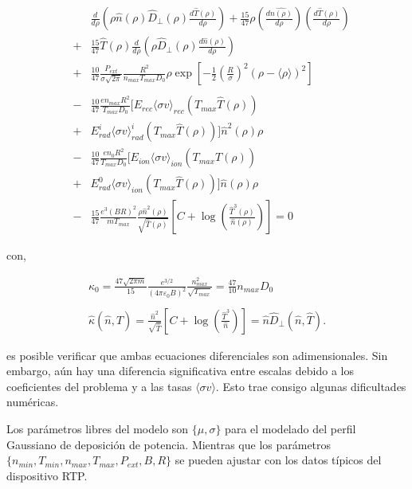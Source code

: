 \begin{eqnarray}
	&& \frac{d}{d\rho}\left(\rho \hat{n}(\rho) \hat{D}_\perp(\rho)\frac{d\hat{T}(\rho)}{d\rho} \right) + \frac{15}{47}\rho\left(\frac{d\hat{n(\rho)}}{d\rho}\right)\left(\frac{d\hat{T}(\rho)}{d\rho}\right) \nonumber \\
	&+& \frac{15}{47}\hat{T}(\rho)\frac{d}{d\rho}\left(\rho \hat{D}_\perp(\rho) \frac{d\hat{n}(\rho)}{d\rho}\right) \nonumber \\ 
	&+& \frac{10}{47}\frac{P_{ext}}{\sigma\sqrt{2\pi}}\frac{R^2}{n_{max}T_{max}D_0}\rho\exp{\left[-\frac{1}{2}\left(\frac{R}{\sigma}\right)^2(\rho - \langle \rho \rangle)^2\right]}\nonumber \\ \nonumber\\
	&-& \frac{10}{47}\frac{ e n_{max}R^2}{T_{max} D_0}\biggl[E_{rec}\langle \sigma v \rangle_{rec}(T_{max}\hat{T}(\rho))\nonumber \\   
	&+& E_{rad}^i\langle \sigma v \rangle_{rad}^i(T_{max}\hat{T}(\rho))\biggr]\hat{n}^2(\rho)\rho \nonumber \\ 
	&-& \frac{10}{47}\frac{e n_0R^2}{T_{max}D_0}\biggl[ E_{ion}\langle \sigma v \rangle_{ion}(T_{max}\hat{T}(\rho)) \nonumber\\ 
	&+& E_{rad}^0\langle \sigma v \rangle_{ion}(T_{max}\hat{T}(\rho)) \biggr]\hat{n}(\rho)\rho \nonumber \\ 
	&-&\frac{15}{47}\frac{e^3(BR)^2}{mT_{max}}\frac{\rho \hat{n}^2(\rho)}{\sqrt{\hat{T}(\rho)}}\left[ C + \log{ \left( \frac{\hat{T}^3(\rho)}{\hat{n}(\rho)}\right)} \right] = 0 \quad
\end{eqnarray}

con,

\begin{eqnarray}
	\kappa_0 = \frac{47\sqrt{2\pi m}}{15}\frac{e^{3/2}}{(4\pi \varepsilon_0 B)^2}\frac{n^2_{max}}{\sqrt{T_{max}}} = \frac{47}{10}n_{max}D_0\\ \nonumber\\
	\hat{\kappa}(\hat{n}, \hat{T}) = \frac{\hat{n}^2}{\sqrt{\hat{T}}} \left[ C + \log{\left(\frac{\hat{T}^3}{\hat{n}} \right)}\right] = \hat{n}\hat{D}_\perp(\hat{n}, \hat{T}).
\end{eqnarray}

 es posible verificar que ambas ecuaciones diferenciales son adimensionales. Sin embargo, aún hay una diferencia significativa entre escalas debido a los coeficientes del problema y a las tasas $\langle\sigma v\rangle$. Esto trae consigo algunas dificultades numéricas. 
 
 Los parámetros libres del modelo son $\{\mu, \sigma\}$ para el modelado del perfil Gaussiano de deposición de potencia. Mientras que los parámetros $\{n_{min}, T_{min}, n_{max}, T_{max}, P_{ext}, B, R\}$ se pueden ajustar con los datos típicos del dispositivo RTP.
 
